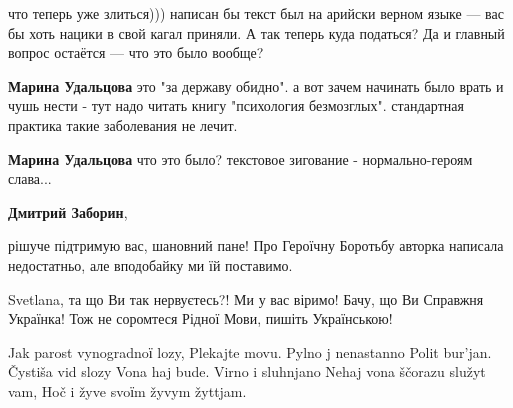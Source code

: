 \begin{itemize}
\begin{itemize}
что теперь уже злиться))) написан бы текст был на арийски верном языке — вас бы
хоть нацики в свой кагал приняли. А так теперь куда податься? Да и главный
вопрос остаётся — что это было вообще?

 
\textbf{Марина Удальцова} это "за державу обидно". а вот зачем начинать было врать и чушь нести - тут надо читать книгу "психология безмозглых". стандартная практика такие заболевания не лечит.

 
\textbf{Марина Удальцова} что это было? текстовое зигование - нормально-героям слава...

 
\textbf{Дмитрий Заборин}, 

рішуче підтримую вас, шановний пане! Про Героїчну Боротьбу авторка написала недостатньо, але вподобайку ми їй поставимо.

 
Svetlana, та що Ви так нервуєтесь?! Ми у вас віримо! Бачу, що Ви Справжня Українка! Тож не соромтеся Рідної Мови, пишіть Українською!

 

\obeycr
	Jak parost vynogradnoї lozy,
	Plekajte movu. Pylno j nenastanno
	Polit bur’jan. Čystiša vid slozy
	Vona haj bude. Virno i sluhnjano
	Nehaj vona ščorazu služyt vam,
	Hoč i žyve svoїm žyvym žyttjam.
\restorecr


\end{itemize}
\end{itemize}
